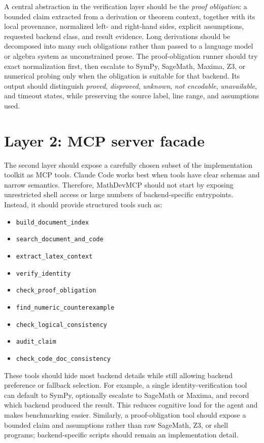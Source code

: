 A central abstraction in the verification layer should be the \emph{proof obligation}: a bounded claim extracted from a derivation or theorem context, together with its local provenance, normalized left- and right-hand sides, explicit assumptions, requested backend class, and result evidence. Long derivations should be decomposed into many such obligations rather than passed to a language model or algebra system as unconstrained prose. The proof-obligation runner should try exact normalization first, then escalate to SymPy, SageMath, Maxima, Z3, or numerical probing only when the obligation is suitable for that backend. Its output should distinguish \emph{proved}, \emph{disproved}, \emph{unknown}, \emph{not encodable}, \emph{unavailable}, and timeout states, while preserving the source label, line range, and assumptions used.

\section{Layer 2: MCP server facade}

The second layer should expose a carefully chosen subset of the implementation toolkit as MCP tools. Claude Code works best when tools have clear schemas and narrow semantics. Therefore, MathDevMCP should not start by exposing unrestricted shell access or large numbers of backend-specific entrypoints. Instead, it should provide structured tools such as:

\begin{itemize}
  \item \texttt{build\_document\_index}
  \item \texttt{search\_document\_and\_code}
  \item \texttt{extract\_latex\_context}
  \item \texttt{verify\_identity}
  \item \texttt{check\_proof\_obligation}
  \item \texttt{find\_numeric\_counterexample}
  \item \texttt{check\_logical\_consistency}
  \item \texttt{audit\_claim}
  \item \texttt{check\_code\_doc\_consistency}
\end{itemize}

These tools should hide most backend details while still allowing backend preference or fallback selection. For example, a single identity-verification tool can default to SymPy, optionally escalate to SageMath or Maxima, and record which backend produced the result. This reduces cognitive load for the agent and makes benchmarking easier. Similarly, a proof-obligation tool should expose a bounded claim and assumptions rather than raw SageMath, Z3, or shell programs; backend-specific scripts should remain an implementation detail.

